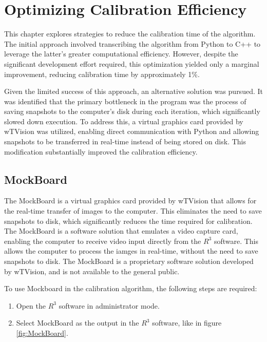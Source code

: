 \chapter{Optimizing Calibration Efficiency} \label{chap:Time}

\noindent This chapter explores strategies to reduce the calibration time of the algorithm. The initial approach involved transcribing the algorithm from Python to C++ to leverage the latter’s greater computational efficiency. However, despite the significant development effort required, this optimization yielded only a marginal improvement, reducing calibration time by approximately 1\%.

\noindent Given the limited success of this approach, an alternative solution was pursued. It was identified that the primary bottleneck in the program was the process of saving snapshots to the computer’s disk during each iteration, which significantly slowed down execution. To address this, a virtual graphics card provided by wTVision was utilized, enabling direct communication with Python and allowing snapshots to be transferred in real-time instead of being stored on disk. This modification substantially improved the calibration efficiency.

\section{MockBoard} \label{sec:MockBoard}   

\noindent The MockBoard is a virtual graphics card provided by wTVision that allows for the real-time transfer of images to the computer. This eliminates the need to save snapshots to disk, which significantly 
reduces the time required for calibration. The MockBoard is a software solution that emulates a video capture card, enabling the computer to receive video input directly from the $R^3$ software. This allows the computer to process the 
iamges in real-time, without the need to save snapshots to disk. The MockBoard is a proprietary software solution developed by wTVision, and is not available to the general public. 

\noindent To use Mockboard in the calibration algorithm, the following steps are required:

\begin{enumerate}
    \item Open the $R^3$ software in administrator mode.
    \item Select MockBoard as the output in the $R^3$ software, like in figure \ref{fig:MockBoard}.
\end{enumerate}

